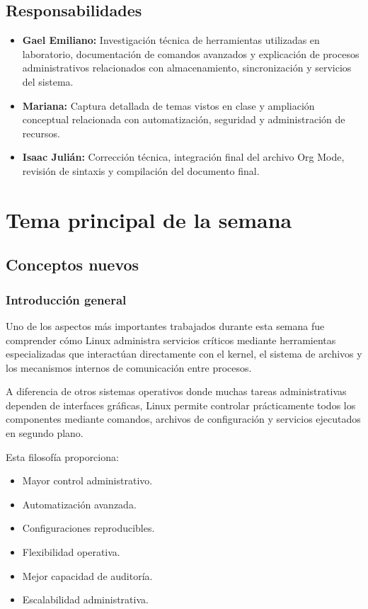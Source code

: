 \documentclass[11pt, letterpaper]{article}
\begin{document}
\subsection{Responsabilidades}
\label{sec:orga087be4}

\begin{itemize}
\item \textbf{Gael Emiliano:} Investigación técnica de herramientas utilizadas en laboratorio, documentación de comandos avanzados y explicación de procesos administrativos relacionados con almacenamiento, sincronización y servicios del sistema.
\item \textbf{Mariana:} Captura detallada de temas vistos en clase y ampliación conceptual relacionada con automatización, seguridad y administración de recursos.
\item \textbf{Isaac Julián:} Corrección técnica, integración final del archivo Org Mode, revisión de sintaxis y compilación del documento final.
\end{itemize}

\newpage
\section{Tema principal de la semana}
\label{sec:org5f7fd25}

\subsection{Conceptos nuevos}
\label{sec:orgcd7407e}

\subsubsection{Introducción general}
\label{sec:orge4dfee9}

Uno de los aspectos más importantes trabajados durante esta semana fue comprender cómo Linux administra servicios críticos mediante herramientas especializadas que interactúan directamente con el kernel, el sistema de archivos y los mecanismos internos de comunicación entre procesos.

A diferencia de otros sistemas operativos donde muchas tareas administrativas dependen de interfaces gráficas, Linux permite controlar prácticamente todos los componentes mediante comandos, archivos de configuración y servicios ejecutados en segundo plano.

Esta filosofía proporciona:

\begin{itemize}
\item Mayor control administrativo.
\item Automatización avanzada.
\item Configuraciones reproducibles.
\item Flexibilidad operativa.
\item Mejor capacidad de auditoría.
\item Escalabilidad administrativa.
\end{itemize}
\end{document}
